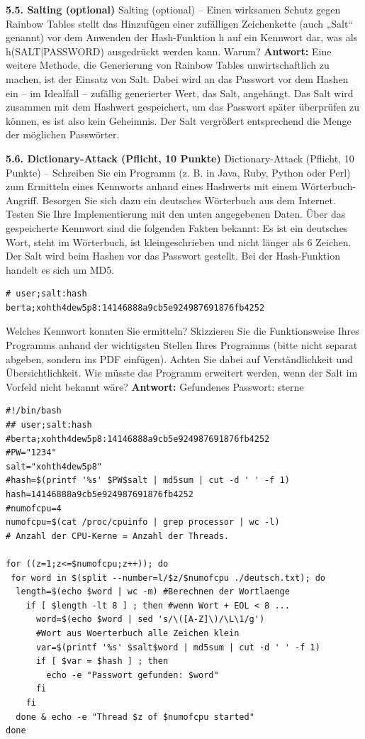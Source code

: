 \documentclass[ngerman]{fbi-aufgabenblatt}
\begin{document}
\textbf{5.5. Salting (optional)}
Salting (optional) – Einen wirksamen Schutz gegen Rainbow Tables stellt das Hinzufügen einer zufälligen Zeichenkette (auch „Salt“ genannt) vor dem Anwenden der Hash-Funktion h auf ein Kennwort dar, was als h(SALT|PASSWORD) ausgedrückt werden kann. Warum?
\textbf{Antwort:}
Eine weitere Methode, die Generierung von Rainbow Tables unwirtschaftlich zu machen, ist der Einsatz von Salt. Dabei wird an das Passwort vor dem Hashen ein – im Idealfall – zufällig generierter Wert, das Salt, angehängt. Das Salt wird zusammen mit dem Hashwert gespeichert, um das Passwort später überprüfen zu können, es ist also kein Geheimnis. Der Salt vergrößert entsprechend die Menge der möglichen Passwörter.

\textbf{5.6. Dictionary-Attack (Pflicht, 10 Punkte)}
Dictionary-Attack (Pflicht, 10 Punkte) – Schreiben Sie ein Programm (z. B. in Java, Ruby, Python oder Perl) zum Ermitteln eines Kennworts anhand eines Hashwerts mit einem Wörterbuch-Angriff. Besorgen Sie sich dazu ein deutsches Wörterbuch aus dem Internet. Testen Sie Ihre Implementierung mit den unten angegebenen Daten. Über das gespeicherte Kennwort sind die folgenden Fakten bekannt: Es ist ein deutsches Wort, steht im Wörterbuch, ist kleingeschrieben und nicht länger als 6 Zeichen. Der Salt wird beim Hashen vor das Passwort gestellt. Bei der Hash-Funktion handelt es sich um MD5. 
\begin{lstlisting}
# user;salt:hash
berta;xohth4dew5p8:14146888a9cb5e924987691876fb4252
\end{lstlisting}
Welches Kennwort konnten Sie ermitteln? Skizzieren Sie die Funktionsweise Ihres Programms anhand der wichtigsten Stellen Ihres Programms (bitte nicht separat abgeben, sondern ins PDF einfügen). Achten Sie dabei auf Verständlichkeit und Übersichtlichkeit.
Wie müsste das Programm erweitert werden, wenn der Salt im Vorfeld nicht bekannt wäre?
\textbf{Antwort:}
Gefundenes Passwort: sterne
\begin{lstlisting}
#!/bin/bash
## user;salt:hash
#berta;xohth4dew5p8:14146888a9cb5e924987691876fb4252
#PW="1234"
salt="xohth4dew5p8"
#hash=$(printf '%s' $PW$salt | md5sum | cut -d ' ' -f 1)
hash=14146888a9cb5e924987691876fb4252
#numofcpu=4
numofcpu=$(cat /proc/cpuinfo | grep processor | wc -l) 
# Anzahl der CPU-Kerne = Anzahl der Threads.

for ((z=1;z<=$numofcpu;z++)); do
 for word in $(split --number=l/$z/$numofcpu ./deutsch.txt); do 
  length=$(echo $word | wc -m) #Berechnen der Wortlaenge
    if [ $length -lt 8 ] ; then #wenn Wort + EOL < 8 ...
      word=$(echo $word | sed 's/\([A-Z]\)/\L\1/g') 
      #Wort aus Woerterbuch alle Zeichen klein
      var=$(printf '%s' $salt$word | md5sum | cut -d ' ' -f 1)
      if [ $var = $hash ] ; then
        echo -e "Passwort gefunden: $word"
      fi
    fi
  done & echo -e "Thread $z of $numofcpu started"
done
\end{lstlisting}
\end{document}

